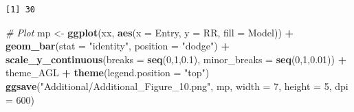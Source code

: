 \documentclass[
]{article}
\newenvironment{Shaded}{\begin{snugshade}}{\end{snugshade}}
\newcommand{\CommentTok}[1]{\textcolor[rgb]{0.56,0.35,0.01}{\textit{#1}}}
\newcommand{\DataTypeTok}[1]{\textcolor[rgb]{0.13,0.29,0.53}{#1}}
\newcommand{\DecValTok}[1]{\textcolor[rgb]{0.00,0.00,0.81}{#1}}
\newcommand{\FloatTok}[1]{\textcolor[rgb]{0.00,0.00,0.81}{#1}}
\newcommand{\KeywordTok}[1]{\textcolor[rgb]{0.13,0.29,0.53}{\textbf{#1}}}
\newcommand{\NormalTok}[1]{#1}
\newcommand{\OperatorTok}[1]{\textcolor[rgb]{0.81,0.36,0.00}{\textbf{#1}}}
\newcommand{\StringTok}[1]{\textcolor[rgb]{0.31,0.60,0.02}{#1}}
\begin{document}
\begin{Shaded}
\end{Shaded}

\begin{verbatim}
[1] 30
\end{verbatim}

\begin{Shaded}
\begin{Highlighting}[]
\CommentTok{# Plot}
\NormalTok{mp <-}\StringTok{ }\KeywordTok{ggplot}\NormalTok{(xx, }\KeywordTok{aes}\NormalTok{(}\DataTypeTok{x =}\NormalTok{ Entry, }\DataTypeTok{y =}\NormalTok{ RR, }\DataTypeTok{fill =}\NormalTok{ Model)) }\OperatorTok{+}\StringTok{ }
\StringTok{  }\KeywordTok{geom_bar}\NormalTok{(}\DataTypeTok{stat =} \StringTok{"identity"}\NormalTok{, }\DataTypeTok{position =} \StringTok{"dodge"}\NormalTok{) }\OperatorTok{+}
\StringTok{  }\KeywordTok{scale_y_continuous}\NormalTok{(}\DataTypeTok{breaks =} \KeywordTok{seq}\NormalTok{(}\DecValTok{0}\NormalTok{,}\DecValTok{1}\NormalTok{,}\FloatTok{0.1}\NormalTok{), }\DataTypeTok{minor_breaks =} \KeywordTok{seq}\NormalTok{(}\DecValTok{0}\NormalTok{,}\DecValTok{1}\NormalTok{,}\FloatTok{0.01}\NormalTok{)) }\OperatorTok{+}
\StringTok{  }\NormalTok{theme_AGL }\OperatorTok{+}\StringTok{ }
\StringTok{  }\KeywordTok{theme}\NormalTok{(}\DataTypeTok{legend.position =} \StringTok{"top"}\NormalTok{) }
\KeywordTok{ggsave}\NormalTok{(}\StringTok{"Additional/Additional_Figure_10.png"}\NormalTok{, mp, }\DataTypeTok{width =} \DecValTok{7}\NormalTok{, }\DataTypeTok{height =} \DecValTok{5}\NormalTok{, }\DataTypeTok{dpi =} \DecValTok{600}\NormalTok{)}
\end{Highlighting}
\end{Shaded}
\end{document}
